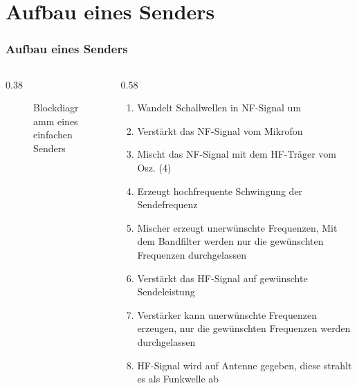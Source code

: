 \section{Aufbau eines Senders}
\label{section:aufbau_sender}
\begin{frame}
    \frametitle{Aufbau eines Senders}
    \begin{columns}[T]
        \begin{column}{0.38\textwidth}
            \begin{figure}
                \caption{\scriptsize Blockdiagramm eines einfachen Senders}
                \label{aufbau_sender}
            \end{figure}
        \end{column}
        \begin{column}{0.58\textwidth}
            \small
            \begin{enumerate}[<+->]
                \item Wandelt Schallwellen in NF-Signal um
                \item Verstärkt das NF-Signal vom Mikrofon
                \item Mischt das NF-Signal mit dem HF-Träger vom Osz. (4)
                \item Erzeugt hochfrequente Schwingung der Sendefrequenz
                \item Mischer erzeugt unerwünschte Frequenzen, Mit dem Bandfilter werden nur die gewünschten Frequenzen durchgelassen
                \item Verstärkt das HF-Signal auf gewünschte Sendeleistung
                \item Verstärker kann unerwünschte Frequenzen erzeugen, nur die gewünschten Frequenzen werden durchgelassen
                \item HF-Signal wird auf Antenne gegeben, diese strahlt es als Funkwelle ab
            \end{enumerate}
        \end{column}
    \end{columns}
\end{frame}

\begin{frame}
\end{frame}

